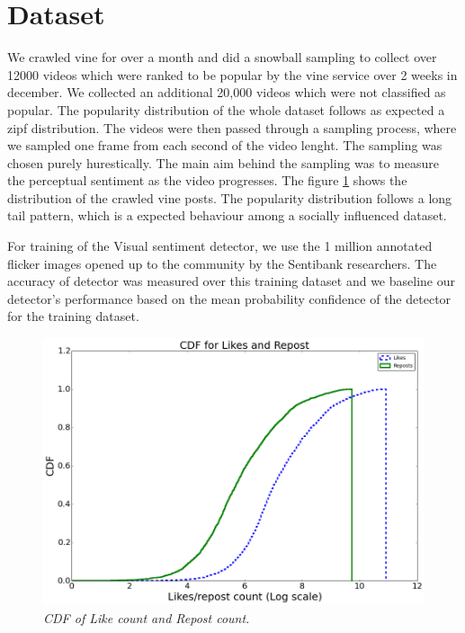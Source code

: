 \section{ Dataset }
We crawled vine for over a month and did a snowball sampling to collect over 12000 videos which were ranked to be popular by the vine service over 2 weeks in december. We collected an additional 20,000 videos which were not classified as popular. The popularity distribution of the whole dataset follows as expected a zipf distribution. The videos were then passed through a sampling process, where we sampled one frame from each second of the video lenght. The sampling was chosen purely hurestically. The main aim behind the sampling was to measure the perceptual sentiment as the video progresses. The figure \ref{fig:CDF_posts} shows the distribution of the crawled vine posts. The popularity distribution follows a long tail pattern, which is a expected behaviour among a socially influenced dataset.
\par
For training of the Visual sentiment detector, we use the 1 million annotated flicker images opened up to the community by the Sentibank researchers. The accuracy of detector was measured over this training dataset and we baseline our detector's performance based on the mean probability confidence of the detector for the training dataset. 

\begin{figure}
\centering
\includegraphics[width=\columnwidth]{plots/CDF_Like_reposts}
\caption{\textsl{ CDF of Like count and Repost count.}}
\label{fig:CDF_posts}
\end{figure}